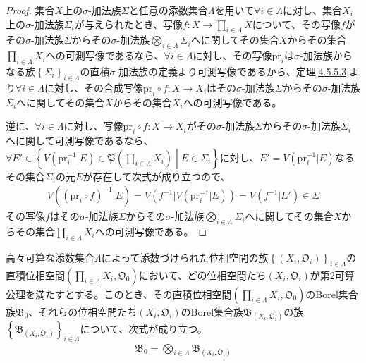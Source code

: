 \documentclass[dvipdfmx]{jsarticle}
\begin{document}
\begin{proof}
集合$X$上の$\sigma$-加法族$\varSigma$と任意の添数集合$\varLambda$を用いて$\forall i \in \varLambda$に対し、集合$X_{i}$上の$\sigma$-加法族$\varSigma_{i}$が与えられたとき、写像$f:X \rightarrow \prod_{i \in \varLambda} X$について、その写像$f$がその$\sigma$-加法族$\varSigma$からその$\sigma$-加法族$\bigotimes_{i \in \varLambda} \varSigma_{i}$へに関してその集合$X$からその集合$\prod_{i \in \varLambda} X_{i}$への可測写像であるなら、$\forall i \in \varLambda$に対し、その写像$\mathrm{pr}_{i}$は$\sigma$-加法族からなる族$\left\{ \varSigma_{i} \right\}_{i \in \varLambda}$の直積$\sigma$-加法族の定義より可測写像であるから、定理\ref{4.5.5.3}より$\forall i \in \varLambda$に対し、その合成写像$\mathrm{pr}_{i} \circ f:X \rightarrow X_{i}$はその$\sigma$-加法族$\varSigma$からその$\sigma$-加法族$\varSigma_{i}$へに関してその集合$X$からその集合$X_{i}$への可測写像である。\par
逆に、$\forall i \in \varLambda$に対し、写像$\mathrm{pr}_{i} \circ f:X \rightarrow X_{i}$がその$\sigma$-加法族$\varSigma$からその$\sigma$-加法族$\varSigma_{i}$へに関して可測写像であるなら、$\forall E' \in \left\{ V\left( \mathrm{pr}_{i}^{- 1}|E \right)\in \mathfrak{P}\left( \prod_{i \in \varLambda} X_{i} \right) \middle| E \in \varSigma_{i} \right\}$に対し、$E' = V\left( \mathrm{pr}_{i}^{- 1}|E \right)$なるその集合$\varSigma_{i}$の元$E$が存在して次式が成り立つので、
\begin{align*}
V\left( \left( \mathrm{pr}_{i} \circ f \right)^{- 1}|E \right) = V\left( f^{- 1}|V\left( \mathrm{pr}_{i}^{- 1}|E \right) \right) = V\left( f^{- 1}|E' \right) \in \varSigma
\end{align*}
その写像$f$はその$\sigma$-加法族$\varSigma$からその$\sigma$-加法族$\bigotimes_{i \in \varLambda} \varSigma_{i}$へに関してその集合$X$からその集合$\prod_{i \in \varLambda} X_{i}$への可測写像である。
\end{proof}
\begin{thm}\label{4.5.5.6}
高々可算な添数集合$\varLambda$によって添数づけられた位相空間の族$\left\{ \left( X_{i},\mathfrak{O}_{i} \right) \right\}_{i \in \varLambda }$の直積位相空間$\left( \prod_{i \in \varLambda } X_{i},\mathfrak{O}_{0} \right)$において、どの位相空間たち$\left( X_{i},\mathfrak{O}_{i} \right)$が第2可算公理を満たすとする。このとき、その直積位相空間$\left( \prod_{i \in \varLambda } X_{i},\mathfrak{O}_{0} \right)$のBorel集合族$\mathfrak{B}_{0}$、それらの位相空間たち$\left( X_{i},\mathfrak{O}_{i} \right)$のBorel集合族$\mathfrak{B}_{\left( X_{i},\mathfrak{O}_{i} \right)}$の族$\left\{ \mathfrak{B}_{\left( X_{i},\mathfrak{O}_{i} \right)} \right\}_{i \in \varLambda }$について、次式が成り立つ。
\begin{align*}
\mathfrak{B}_{0} = \bigotimes_{i \in \varLambda } \mathfrak{B}_{\left( X_{i},\mathfrak{O}_{i} \right)}
\end{align*}
\end{thm}
\end{document}
